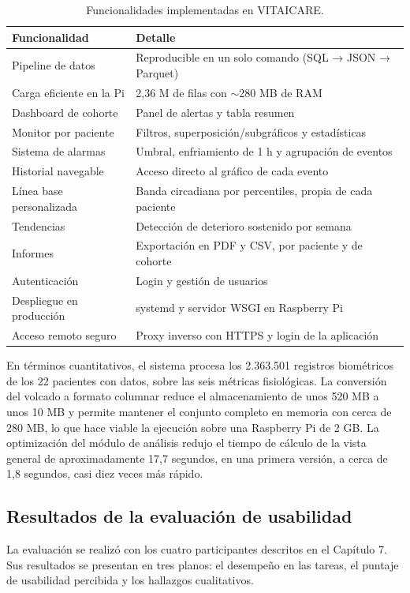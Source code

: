 \begin{table}[h!]
\centering
\begin{tabular}{ll}
\hline
Funcionalidad & Detalle \\
\hline
Pipeline de datos & Reproducible en un solo comando (SQL → JSON → Parquet) \\
Carga eficiente en la Pi & 2,36 M de filas con $\sim$280 MB de RAM \\
Dashboard de cohorte & Panel de alertas y tabla resumen \\
Monitor por paciente & Filtros, superposición/subgráficos y estadísticas \\
Sistema de alarmas & Umbral, enfriamiento de 1 h y agrupación de eventos \\
Historial navegable & Acceso directo al gráfico de cada evento \\
Línea base personalizada & Banda circadiana por percentiles, propia de cada paciente \\
Tendencias & Detección de deterioro sostenido por semana \\
Informes & Exportación en PDF y CSV, por paciente y de cohorte \\
Autenticación & Login y gestión de usuarios \\
Despliegue en producción & systemd y servidor WSGI en Raspberry Pi \\
Acceso remoto seguro & Proxy inverso con HTTPS y login de la aplicación \\
\hline
\end{tabular}
\caption{Funcionalidades implementadas en VITAICARE.}
\end{table}
En términos cuantitativos, el sistema procesa los 2.363.501 registros biométricos de los 22 pacientes con datos, sobre las seis métricas fisiológicas. La conversión del volcado a formato columnar reduce el almacenamiento de unos 520 MB a unos 10 MB y permite mantener el conjunto completo en memoria con cerca de 280 MB, lo que hace viable la ejecución sobre una Raspberry Pi de 2 GB. La optimización del módulo de análisis redujo el tiempo de cálculo de la vista general de aproximadamente 17,7 segundos, en una primera versión, a cerca de 1,8 segundos, casi diez veces más rápido.\\


\subsection{Resultados de la evaluación de usabilidad}
La evaluación se realizó con los cuatro participantes descritos en el Capítulo 7. Sus resultados se presentan en tres planos: el desempeño en las tareas, el puntaje de usabilidad percibida y los hallazgos cualitativos.\\


